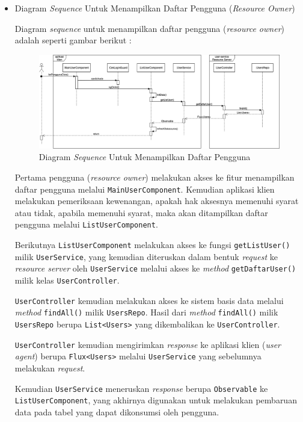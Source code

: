 \documentclass[pdftex,12pt, oneside]{article}
\begin{document}
\begin{itemize}
	\item Diagram \textit{Sequence} Untuk Menampilkan Daftar Pengguna (\textit{Resource Owner})
	
	Diagram \textit{sequence} untuk menampilkan daftar pengguna (\textit{resource owner}) adalah seperti gambar berikut :
	
	\begin{figure}[H]
		\centering
		\includegraphics[width=1\textwidth]{./resources/seq-list-user}
		\caption{Diagram \textit{Sequence} Untuk Menampilkan Daftar Pengguna}
		\label{fig:seq-list-user}
	\end{figure}
	
	Pertama pengguna (\textit{resource owner}) melakukan akses ke fitur menampilkan daftar pengguna melalui \texttt{MainUserComponent}. Kemudian aplikasi klien melakukan pemeriksaan kewenangan, apakah hak aksesnya memenuhi syarat atau tidak, apabila memenuhi syarat, maka akan ditampilkan daftar pengguna melalui \texttt{ListUserComponent}.
	
	Berikutnya \texttt{ListUserComponent} melakukan akses ke fungsi \texttt{getListUser()} milik \texttt{UserService}, yang kemudian diteruskan dalam bentuk \textit{request} ke \textit{resource server} oleh \texttt{UserService} melalui akses ke \textit{method} \texttt{getDaftarUser()} milik kelas \texttt{UserController}.
	
	\texttt{UserController} kemudian melakukan akses ke sistem basis data melalui \textit{method} \texttt{findAll()} milik \texttt{UsersRepo}. Hasil dari \textit{method} \texttt{findAll()} milik \texttt{UsersRepo} berupa \texttt{List<Users>} yang dikembalikan ke \texttt{UserController}.
	
	\texttt{UserController} kemudian mengirimkan \textit{response} ke aplikasi klien (\textit{user agent}) berupa \texttt{Flux<Users>} melalui \texttt{UserService} yang sebelumnya melakukan \textit{request}.
	
	Kemudian \texttt{UserService} meneruskan \textit{response} berupa \texttt{Observable} ke \texttt{ListUserComponent}, yang akhirnya digunakan untuk melakukan pembaruan data pada tabel yang dapat dikonsumsi oleh pengguna.
	

\end{itemize}
\end{document}
